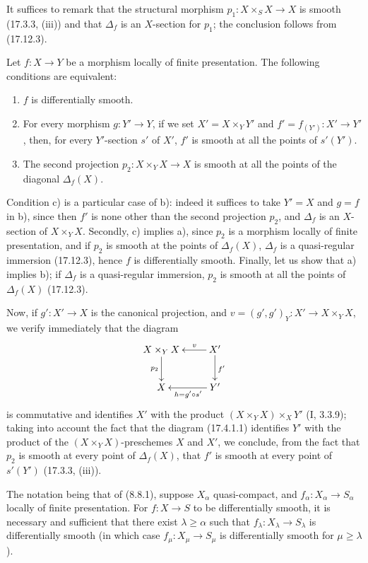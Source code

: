 It suffices to remark that the structural morphism $p_1:X\times_SX\to X$ is smooth (17.3.3, (iii)) and that $\Delta_f$ is an $X$-section for $p_1$; the conclusion follows from (17.12.3).

\begin{proposition}[17.12.5]
\label{IV.17.12.5}
Let $f:X\to Y$ be a morphism locally of finite presentation. The following conditions are equivalent:
\begin{enumerate}
  \item[a)] $f$ is differentially smooth.
  \item[b)] For every morphism $g:Y'\to Y$, if we set $X'=X\times_Y Y'$ and $f'=f_{(Y')}:X'\to Y'$, then, for every $Y'$-section $s'$ of $X'$, $f'$ is smooth at all the points of $s'(Y')$.
  \item[c)] The second projection $p_2:X\times_YX\to X$ is smooth at all the points of the diagonal $\Delta_f(X)$.
\end{enumerate}
\end{proposition}


Condition c) is a particular case of b): indeed it suffices to take $Y'=X$ and $g=f$ in b), since then $f'$ is none other than the second projection $p_2$, and $\Delta_f$ is an $X$-section of $X\times_YX$. Secondly, c) implies a), since $p_2$ is a morphism locally of finite presentation, and if $p_2$ is smooth at the points of $\Delta_f(X)$, $\Delta_f$ is a quasi-regular immersion (17.12.3), hence $f$ is differentially smooth. Finally, let us show that a) implies b); if $\Delta_f$ is a quasi-regular immersion, $p_2$ is smooth at all the points of $\Delta_f(X)$ (17.12.3).

Now, if $g':X'\to X$ is the canonical projection, and $v=(g',g')_Y:X'\to X\times_YX$, we verify immediately that the diagram
\[
\xymatrix{
  X\times_Y X \ar[d]_{p_2} & X' \ar[l]_-v \ar[d]^{f'}\\
  X & Y' \ar[l]^{h=g'\circ s'}
}
\]
is commutative and identifies $X'$ with the product $(X\times_YX)\times_XY'$ (I, 3.3.9); taking into account the fact that the diagram (17.4.1.1) identifies $Y'$ with the product of the $(X\times_YX)$-preschemes $X$ and $X'$, we conclude, from the fact that $p_2$ is smooth at every point of $\Delta_f(X)$, that $f'$ is smooth at every point of $s'(Y')$ (17.3.3, (iii)).

\begin{corollary}[17.12.6]
\label{IV.17.12.6}
The notation being that of (8.8.1), suppose $X_\alpha$ quasi-compact, and $f_\alpha:X_\alpha\to S_\alpha$ locally of finite presentation. For $f:X\to S$ to be differentially smooth, it is necessary and sufficient that there exist $\lambda\geq\alpha$ such that $f_\lambda:X_\lambda\to S_\lambda$ is differentially smooth (in which case $f_\mu:X_\mu\to S_\mu$ is differentially smooth for $\mu\geq\lambda$).
\end{corollary}

